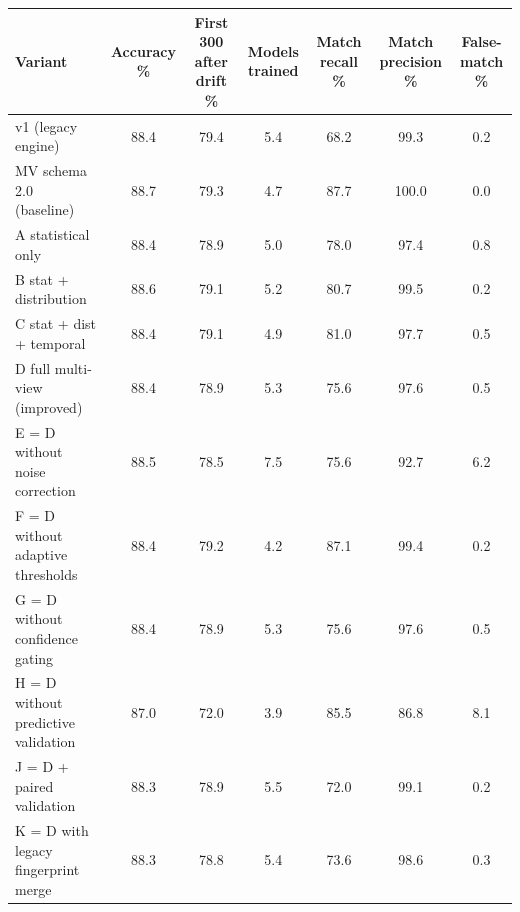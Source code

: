 \renewcommand{\arraystretch}{1.2}\begin{tabular}{@{}lcccccc@{}}\toprule
\textbf{Variant} & \textbf{Accuracy \%} & \textbf{First 300 after drift \%} & \textbf{Models trained} & \textbf{Match recall \%} & \textbf{Match precision \%} & \textbf{False-match \%}\\\midrule
v1 (legacy engine) & 88.4 & 79.4 & 5.4 & 68.2 & 99.3 & 0.2 \\
MV schema 2.0 (baseline) & 88.7 & 79.3 & 4.7 & 87.7 & 100.0 & 0.0 \\
A statistical only & 88.4 & 78.9 & 5.0 & 78.0 & 97.4 & 0.8 \\
B stat + distribution & 88.6 & 79.1 & 5.2 & 80.7 & 99.5 & 0.2 \\
C stat + dist + temporal & 88.4 & 79.1 & 4.9 & 81.0 & 97.7 & 0.5 \\
D full multi-view (improved) & 88.4 & 78.9 & 5.3 & 75.6 & 97.6 & 0.5 \\
E = D without noise correction & 88.5 & 78.5 & 7.5 & 75.6 & 92.7 & 6.2 \\
F = D without adaptive thresholds & 88.4 & 79.2 & 4.2 & 87.1 & 99.4 & 0.2 \\
G = D without confidence gating & 88.4 & 78.9 & 5.3 & 75.6 & 97.6 & 0.5 \\
H = D without predictive validation & 87.0 & 72.0 & 3.9 & 85.5 & 86.8 & 8.1 \\
J = D + paired validation & 88.3 & 78.9 & 5.5 & 72.0 & 99.1 & 0.2 \\
K = D with legacy fingerprint merge & 88.3 & 78.8 & 5.4 & 73.6 & 98.6 & 0.3 \\
\bottomrule\end{tabular}
